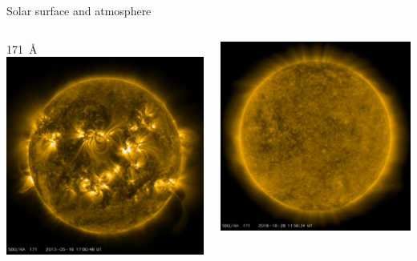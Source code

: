 \begin{frame}[plain,c,label=wavelengths]{Solar surface and atmosphere}{}
\begin{columns}[c]
	
		\centering \small \SI{171}{\AA} \color{white}{g}
		\includegraphics[width=\textwidth]{../talk_figures/20130516_170048_1024_0171.jpg}
		
		\includegraphics[width=\textwidth]{../talk_figures/20181028_115634_1024_0171.jpg}
		

\end{columns}
\end{frame}
